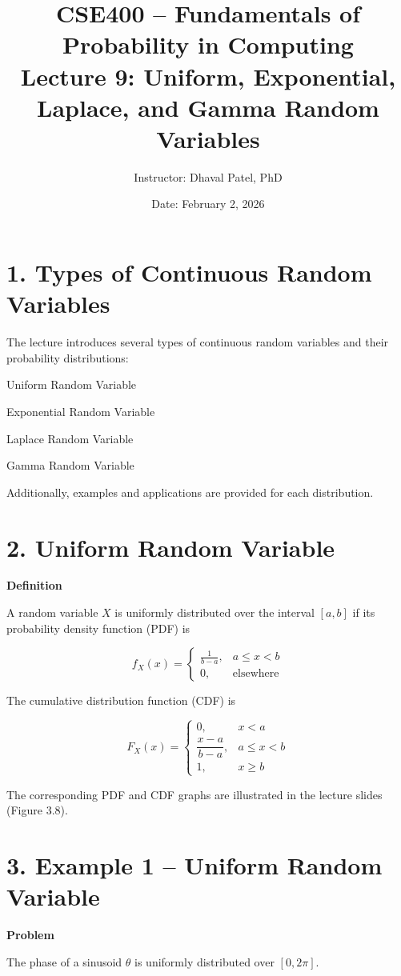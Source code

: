 \documentclass[12pt]{article}
\title{CSE400 – Fundamentals of Probability in Computing\\
Lecture 9: Uniform, Exponential, Laplace, and Gamma Random Variables}
\author{Instructor: Dhaval Patel, PhD}
\date{Date: February 2, 2026}
\begin{document}
\maketitle

\section*{1. Types of Continuous Random Variables}

The lecture introduces several types of continuous random variables and their probability distributions:

Uniform Random Variable

Exponential Random Variable

Laplace Random Variable

Gamma Random Variable

Additionally, examples and applications are provided for each distribution.

\section*{2. Uniform Random Variable}

\textbf{Definition}

A random variable $X$ is uniformly distributed over the interval $[a,b]$ if its probability density function (PDF) is

\[
f_X(x)=
\begin{cases}
\frac{1}{b-a}, & a \le x < b \\
0, & \text{elsewhere}
\end{cases}
\]

The cumulative distribution function (CDF) is

\[
F_X(x)=
\begin{cases}
0, & x<a \\
\dfrac{x-a}{b-a}, & a \le x < b \\
1, & x\ge b
\end{cases}
\]

The corresponding PDF and CDF graphs are illustrated in the lecture slides (Figure 3.8).

\section*{3. Example 1 – Uniform Random Variable}

\textbf{Problem}

The phase of a sinusoid $\theta$ is uniformly distributed over $[0,2\pi]$.
\end{document}
